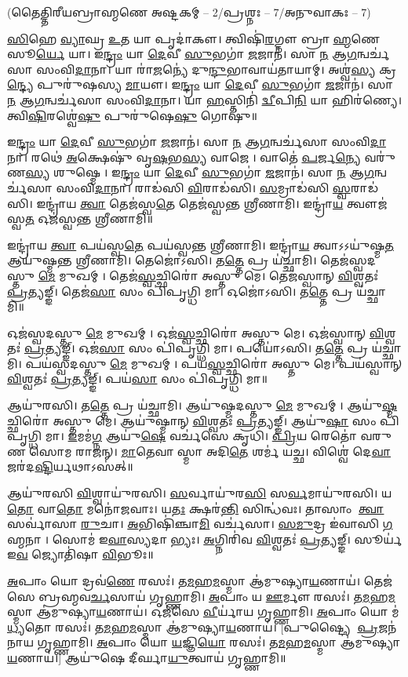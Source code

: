 \centerline{\normalsize (𑌤𑍈𑌤𑍍𑌤𑌿𑌰𑍀𑌯𑌬𑍍𑌰𑌾𑌹𑍍𑌮𑌣𑍇 𑌅𑌷𑍍𑌟𑌕𑌮𑍍 – 2/𑌪𑍍𑌰𑌶𑍍𑌨𑌃 – 7/𑌅𑌨𑍁𑌵𑌾𑌕𑌃 – 7)}
\ul{𑌸𑌿}\ul{}𑌹𑍇 \ul{𑌵𑍍𑌯𑌾}𑌘𑍍𑌰 \ul{𑌉}𑌤 𑌯𑌾 𑌪𑍃𑌦𑌾॑𑌕𑍗।
𑌤𑍍𑌵𑌿𑌷𑌿॑\ul{𑌰}𑌗𑍍𑌨𑍗 𑌬𑍍𑌰𑌾\ul{𑌹𑍍𑌮}𑌣𑍇 𑌸𑍂\ul{𑌰𑍍𑌯𑍇} 𑌯𑌾।
𑌇\ul{𑌨𑍍𑌦𑍍𑌰𑌂} 𑌯𑌾 \ul{𑌦𑍇}𑌵𑍀 \ul{𑌸𑍁}𑌭𑌗𑌾॑ \ul{𑌜}𑌜𑌾𑌨॑।
𑌸𑌾 \ul{𑌨} 𑌆\ul{𑌗}𑌨𑍍𑌵𑌰𑍍𑌚॑𑌸𑌾 𑌸𑌂𑌵𑌿\ul{𑌦𑌾}𑌨𑌾।
𑌯𑌾 𑌰𑌾॑\ul{𑌜}𑌨𑍍𑌯𑍇॑ 𑌦𑍁\ul{𑌨𑍍𑌦𑍁}𑌭𑌾𑌵𑌾𑌯॑𑌤𑌾𑌯𑌾𑌮𑍍।
𑌅𑌶𑍍𑌵॑\ul{𑌸𑍍𑌯} 𑌕𑍍𑌰\ul{𑌨𑍍𑌦𑍍𑌯𑍇} 𑌪𑍁𑌰𑍁॑𑌷𑌸𑍍𑌯 \ul{𑌮𑌾}𑌯𑍗।
𑌇\ul{𑌨𑍍𑌦𑍍𑌰𑌂} 𑌯𑌾 \ul{𑌦𑍇}𑌵𑍀 \ul{𑌸𑍁}𑌭𑌗𑌾॑ \ul{𑌜}𑌜𑌾𑌨॑।
𑌸𑌾 \ul{𑌨} 𑌆\ul{𑌗}𑌨𑍍𑌵𑌰𑍍𑌚॑𑌸𑌾 𑌸𑌂𑌵𑌿\ul{𑌦𑌾}𑌨𑌾।
𑌯𑌾 \ul{𑌹}𑌸𑍍𑌤𑌿𑌨𑌿॑ \ul{𑌦𑍍𑌵𑍀}𑌪𑌿\ul{𑌨𑌿} 𑌯𑌾 𑌹𑌿𑌰॑𑌣𑍍𑌯𑍇।
𑌤𑍍𑌵𑌿\ul{𑌷𑌿}𑌰𑌶𑍍𑌵𑍇॑\ul{𑌷𑍁} 𑌪𑍁𑌰𑍁॑𑌷𑍇\ul{𑌷𑍁} 𑌗𑍋𑌷𑍁॑॥

𑌇\ul{𑌨𑍍𑌦𑍍𑌰𑌂} 𑌯𑌾 \ul{𑌦𑍇}𑌵𑍀 \ul{𑌸𑍁}𑌭𑌗𑌾॑ \ul{𑌜}𑌜𑌾𑌨॑।
𑌸𑌾 \ul{𑌨} 𑌆\ul{𑌗}𑌨𑍍𑌵𑌰𑍍𑌚॑𑌸𑌾 𑌸𑌂𑌵𑌿\ul{𑌦𑌾}𑌨𑌾।
𑌰𑌥𑍇॑ \ul{𑌅}𑌕𑍍𑌷𑍇𑌷𑍁॑ 𑌵𑍃\ul{𑌷}𑌭\ul{𑌸𑍍𑌯} 𑌵𑌾𑌜𑍇।
𑌵𑌾𑌤𑍇॑ \ul{𑌪}𑌰𑍍𑌜\ul{𑌨𑍍𑌯𑍇} 𑌵𑌰𑍁॑𑌣\ul{𑌸𑍍𑌯} 𑌶𑍁𑌷𑍍𑌮𑍇।
𑌇\ul{𑌨𑍍𑌦𑍍𑌰𑌂} 𑌯𑌾 \ul{𑌦𑍇}𑌵𑍀 \ul{𑌸𑍁}𑌭𑌗𑌾॑ \ul{𑌜}𑌜𑌾𑌨॑।
𑌸𑌾 \ul{𑌨} 𑌆\ul{𑌗}𑌨𑍍𑌵𑌰𑍍𑌚॑𑌸𑌾 𑌸𑌂𑌵𑌿\ul{𑌦𑌾}𑌨𑌾।
𑌰𑌾𑌡॑𑌸𑌿 \ul{𑌵𑌿}𑌰𑌾𑌡॑𑌸𑌿।
\ul{𑌸}𑌮𑍍𑌰𑌾𑌡॑𑌸𑌿 \ul{𑌸𑍍𑌵}𑌰𑌾𑌡॑𑌸𑌿।
𑌇𑌨𑍍𑌦𑍍𑌰𑌾॑𑌯 \ul{𑌤𑍍𑌵𑌾} 𑌤𑍇𑌜॑𑌸𑍍𑌵\ul{𑌤𑍇} 𑌤𑍇𑌜॑𑌸𑍍𑌵𑌨𑍍𑌤 𑌶𑍍𑌰𑍀𑌣𑌾𑌮𑌿।
𑌇𑌨𑍍𑌦𑍍𑌰𑌾॑\ul{𑌯} 𑌤𑍍𑌵𑍗𑌜॑𑌸𑍍𑌵\ul{𑌤} 𑌓𑌜॑𑌸𑍍𑌵𑌨𑍍𑌤 𑌶𑍍𑌰𑍀𑌣𑌾𑌮𑌿॥

𑌇𑌨𑍍𑌦𑍍𑌰𑌾॑𑌯 \ul{𑌤𑍍𑌵𑌾} 𑌪𑌯॑𑌸𑍍𑌵\ul{𑌤𑍇} 𑌪𑌯॑𑌸𑍍𑌵𑌨𑍍𑌤 𑌶𑍍𑌰𑍀𑌣𑌾𑌮𑌿।
𑌇𑌨𑍍𑌦𑍍𑌰𑌾॑\ul{𑌯} 𑌤𑍍𑌵𑌾𑌽𑌽𑌯𑍁॑𑌷𑍍𑌮\ul{𑌤} 𑌆𑌯𑍁॑𑌷𑍍𑌮𑌨𑍍𑌤 𑌶𑍍𑌰𑍀𑌣𑌾𑌮𑌿।
𑌤𑍇𑌜𑍋॑𑌽𑌸𑌿।
𑌤\ul{𑌤𑍍𑌤𑍇} 𑌪𑍍𑌰 𑌯॑𑌚𑍍𑌛𑌾𑌮𑌿।
𑌤𑍇𑌜॑𑌸𑍍𑌵𑌦𑌸𑍍𑌤𑍁 \ul{𑌮𑍇} 𑌮𑍁𑌖𑌮𑍍।
𑌤𑍇𑌜॑\ul{𑌸𑍍𑌵}𑌚𑍍𑌛𑌿𑌰𑍋॑ 𑌅𑌸𑍍𑌤𑍁 𑌮𑍇।
𑌤𑍇𑌜॑𑌸𑍍𑌵𑌾𑌨𑍍 \ul{𑌵𑌿}𑌶𑍍𑌵𑌤𑌃॑ \ul{𑌪𑍍𑌰}𑌤𑍍𑌯𑌙𑍍𑌙𑍍।
𑌤𑍇𑌜॑\ul{𑌸𑌾} 𑌸𑌂 𑌪𑌿॑𑌪𑍃𑌗𑍍𑌧𑌿 𑌮𑌾।
𑌓𑌜𑍋॑𑌽𑌸𑌿।
𑌤\ul{𑌤𑍍𑌤𑍇} 𑌪𑍍𑌰 𑌯॑𑌚𑍍𑌛𑌾𑌮𑌿॥

𑌓𑌜॑𑌸𑍍𑌵𑌦𑌸𑍍𑌤𑍁 \ul{𑌮𑍇} 𑌮𑍁𑌖𑌮𑍍।
𑌓𑌜॑\ul{𑌸𑍍𑌵}𑌚𑍍𑌛𑌿𑌰𑍋॑ 𑌅𑌸𑍍𑌤𑍁 𑌮𑍇।
𑌓𑌜॑𑌸𑍍𑌵𑌾𑌨𑍍 \ul{𑌵𑌿}𑌶𑍍𑌵𑌤𑌃॑ \ul{𑌪𑍍𑌰}𑌤𑍍𑌯𑌙𑍍𑌙𑍍।
𑌓𑌜॑\ul{𑌸𑌾} 𑌸𑌂 𑌪𑌿॑𑌪𑍃𑌗𑍍𑌧𑌿 𑌮𑌾।
𑌪𑌯𑍋॑𑌽𑌸𑌿।
𑌤\ul{𑌤𑍍𑌤𑍇} 𑌪𑍍𑌰 𑌯॑𑌚𑍍𑌛𑌾𑌮𑌿।
𑌪𑌯॑𑌸𑍍𑌵𑌦𑌸𑍍𑌤𑍁 \ul{𑌮𑍇} 𑌮𑍁𑌖𑌮𑍍।
𑌪𑌯॑\ul{𑌸𑍍𑌵}𑌚𑍍𑌛𑌿𑌰𑍋॑ 𑌅𑌸𑍍𑌤𑍁 𑌮𑍇।
𑌪𑌯॑𑌸𑍍𑌵𑌾𑌨𑍍 \ul{𑌵𑌿}𑌶𑍍𑌵𑌤𑌃॑ \ul{𑌪𑍍𑌰}𑌤𑍍𑌯𑌙𑍍𑌙𑍍।
𑌪𑌯॑\ul{𑌸𑌾} 𑌸𑌂 𑌪𑌿॑𑌪𑍃𑌗𑍍𑌧𑌿 𑌮𑌾॥

𑌆𑌯𑍁॑𑌰𑌸𑌿।
𑌤\ul{𑌤𑍍𑌤𑍇} 𑌪𑍍𑌰 𑌯॑𑌚𑍍𑌛𑌾𑌮𑌿।
𑌆𑌯𑍁॑𑌷𑍍𑌮𑌦𑌸𑍍𑌤𑍁 \ul{𑌮𑍇} 𑌮𑍁𑌖𑌮𑍍।
𑌆𑌯𑍁॑\ul{𑌷𑍍𑌮}𑌚𑍍𑌛𑌿𑌰𑍋॑ 𑌅𑌸𑍍𑌤𑍁 𑌮𑍇।
𑌆𑌯𑍁॑𑌷𑍍𑌮𑌾𑌨𑍍 \ul{𑌵𑌿}𑌶𑍍𑌵𑌤𑌃॑ \ul{𑌪𑍍𑌰}𑌤𑍍𑌯𑌙𑍍𑌙𑍍।
𑌆𑌯𑍁॑\ul{𑌷𑌾} 𑌸𑌂 𑌪𑌿॑𑌪𑍃𑌗𑍍𑌧𑌿 𑌮𑌾।
\ul{𑌇}𑌮𑌮॑\ul{𑌗𑍍𑌨} 𑌆𑌯𑍁॑\ul{𑌷𑍇} 𑌵𑌰𑍍𑌚॑𑌸𑍇 𑌕𑍃𑌧𑌿।
\ul{𑌪𑍍𑌰𑌿}𑌯 𑌰𑍇𑌤𑍋॑ 𑌵𑌰𑍁𑌣 𑌸𑍋𑌮 𑌰𑌾𑌜𑌨𑍍।
\ul{𑌮𑌾}𑌤𑍇𑌵𑌾𑌸𑍍𑌮𑌾 𑌅𑌦𑌿\ul{𑌤𑍇} 𑌶𑌰𑍍𑌮॑ 𑌯𑌚𑍍𑌛।
𑌵𑌿𑌶𑍍𑌵𑍇॑ 𑌦𑍇\ul{𑌵𑌾} 𑌜𑌰॑𑌦\ul{𑌷𑍍𑌟𑌿}𑌰𑍍𑌯𑌥𑌾𑌽𑌸॑𑌤𑍍॥

𑌆𑌯𑍁॑𑌰𑌸𑌿 \ul{𑌵𑌿}𑌶𑍍𑌵𑌾𑌯𑍁॑𑌰𑌸𑌿।
\ul{𑌸}𑌰𑍍𑌵𑌾𑌯𑍁॑𑌰\ul{𑌸𑌿} 𑌸\ul{𑌰𑍍𑌵}𑌮𑌾𑌯𑍁॑𑌰𑌸𑌿।
𑌯\ul{𑌤𑍋} 𑌵𑌾\ul{𑌤𑍋} 𑌮𑌨𑍋॑𑌜𑌵𑌾𑌃।
𑌯\ul{𑌤𑌃} 𑌕𑍍𑌷𑌰॑\ul{𑌨𑍍𑌤𑌿} 𑌸𑌿𑌨𑍍𑌧॑𑌵𑌃।
𑌤𑌾𑌸𑌾𑌂 \ul{𑌤𑍍𑌵𑌾} 𑌸𑌰𑍍𑌵𑌾॑𑌸𑌾 \ul{𑌰𑍁}𑌚𑌾।
\ul{𑌅}𑌭𑌿𑌷𑌿॑𑌞𑍍𑌚𑌾\ul{𑌮𑌿} 𑌵𑌰𑍍𑌚॑𑌸𑌾।
\ul{𑌸}\ul{𑌮𑍁}𑌦𑍍𑌰 𑌇॑𑌵𑌾𑌸𑌿 \ul{𑌗}𑌹𑍍𑌮𑌨𑌾।
𑌸𑍋𑌮॑ 𑌇\ul{𑌵𑌾}𑌸𑍍𑌯𑌦𑌾𑌭𑍍𑌯𑌃।
\ul{𑌅}𑌗𑍍𑌨𑌿𑌰𑌿॑𑌵 \ul{𑌵𑌿}𑌶𑍍𑌵𑌤𑌃॑ \ul{𑌪𑍍𑌰}𑌤𑍍𑌯𑌙𑍍𑌙𑍍।
𑌸𑍂𑌰𑍍𑌯॑ 𑌇\ul{𑌵} 𑌜𑍍𑌯𑍋𑌤𑌿॑𑌷𑌾 \ul{𑌵𑌿}𑌭𑍂𑌃॥


\ul{𑌅}𑌪𑌾𑌂 𑌯𑍋 𑌦𑍍𑌰𑌵॑\ul{𑌣𑍇} 𑌰𑌸𑌃॑।
𑌤\ul{𑌮}𑌹\ul{𑌮}𑌸𑍍𑌮𑌾 𑌆॑𑌮𑍁𑌷𑍍𑌯𑌾\ul{𑌯}𑌣𑌾𑌯॑।
𑌤𑍇𑌜॑𑌸𑍇 𑌬𑍍𑌰𑌹𑍍𑌮𑌵\ul{𑌰𑍍𑌚}𑌸𑌾𑌯॑ 𑌗𑍃𑌹𑍍𑌣𑌾𑌮𑌿।
\ul{𑌅}𑌪𑌾𑌂 𑌯 \ul{𑌊}𑌰𑍍𑌮𑍗 𑌰𑌸𑌃॑।
𑌤\ul{𑌮}𑌹\ul{𑌮}𑌸𑍍𑌮𑌾 𑌆॑𑌮𑍁𑌷𑍍𑌯𑌾\ul{𑌯}𑌣𑌾𑌯॑।
𑌓𑌜॑𑌸𑍇 \ul{𑌵𑍀}𑌰𑍍𑌯𑌾॑𑌯 𑌗𑍃𑌹𑍍𑌣𑌾𑌮𑌿।
\ul{𑌅}𑌪𑌾𑌂 𑌯𑍋 𑌮॑\ul{𑌧𑍍𑌯}𑌤𑍋 𑌰𑌸𑌃॑।
𑌤\ul{𑌮}𑌹\ul{𑌮}𑌸𑍍𑌮𑌾 𑌆॑𑌮𑍁𑌷𑍍𑌯𑌾\ul{𑌯}𑌣𑌾𑌯॑।
[𑌪𑍁𑌷𑍍𑌟𑍍𑌯𑍈 \ul{𑌪𑍍𑌰}𑌜𑌨॑𑌨𑌾𑌯 𑌗𑍃𑌹𑍍𑌣𑌾𑌮𑌿।
\ul{𑌅}𑌪𑌾𑌂 𑌯𑍋 \ul{𑌯}𑌜𑍍𑌞𑌿\ul{𑌯𑍋} 𑌰𑌸𑌃॑।
𑌤\ul{𑌮}𑌹\ul{𑌮}𑌸𑍍𑌮𑌾 𑌆॑𑌮𑍁𑌷𑍍𑌯𑌾\ul{𑌯}𑌣𑌾𑌯॑।]
𑌆𑌯𑍁॑𑌷𑍇 𑌦𑍀𑌰𑍍𑌘𑌾\ul{𑌯𑍁}𑌤𑍍𑌵𑌾𑌯॑ 𑌗𑍃𑌹𑍍𑌣𑌾𑌮𑌿॥

